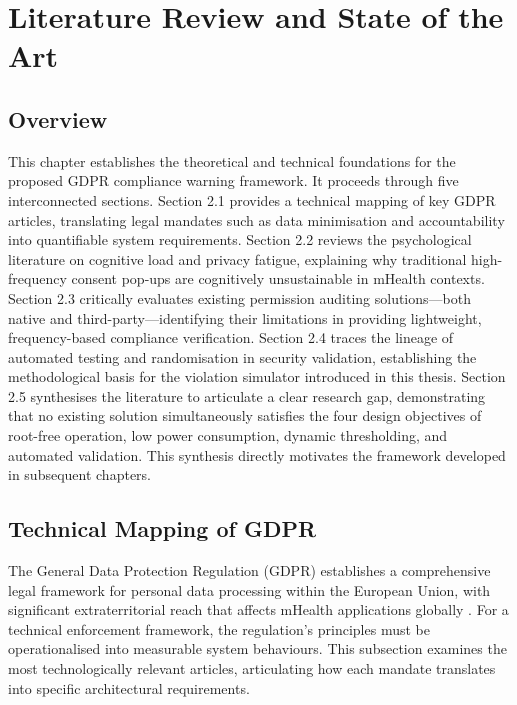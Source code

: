 \newpage\section{Literature Review and State of the Art}

\subsection{Overview}
This chapter establishes the theoretical and technical foundations for the proposed GDPR compliance warning framework. It proceeds through five interconnected sections. Section 2.1 provides a technical mapping of key GDPR articles, translating legal mandates such as data minimisation and accountability into quantifiable system requirements. Section 2.2 reviews the psychological literature on cognitive load and privacy fatigue, explaining why traditional high-frequency consent pop-ups are cognitively unsustainable in mHealth contexts. Section 2.3 critically evaluates existing permission auditing solutions—both native and third-party—identifying their limitations in providing lightweight, frequency-based compliance verification. Section 2.4 traces the lineage of automated testing and randomisation in security validation, establishing the methodological basis for the violation simulator introduced in this thesis. Section 2.5 synthesises the literature to articulate a clear research gap, demonstrating that no existing solution simultaneously satisfies the four design objectives of root-free operation, low power consumption, dynamic thresholding, and automated validation. This synthesis directly motivates the framework developed in subsequent chapters.

\subsection{Technical Mapping of GDPR}
The General Data Protection Regulation (GDPR) establishes a comprehensive legal framework for personal data processing within the European Union, with significant extraterritorial reach that affects mHealth applications globally \cite{1}. For a technical enforcement framework, the regulation's principles must be operationalised into measurable system behaviours. This subsection examines the most technologically relevant articles, articulating how each mandate translates into specific architectural requirements.

